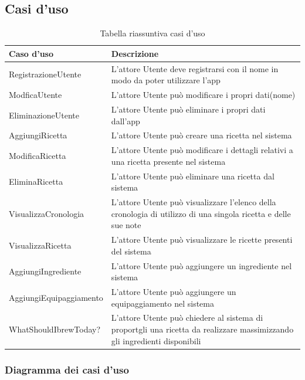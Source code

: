 \documentclass[12pt]{article}
\begin{document}
\subsection{Casi d'uso}

\begin{table}[H] %

\centering
\begin{tabular}{l|p{10cm}}%
Caso d'uso & Descrizione \\
\hline\hline
RegistrazioneUtente & L'attore Utente deve registrarsi con il nome in modo da poter utilizzare l'app \\
\hline
ModficaUtente & L'attore Utente può modificare i propri dati(nome) \\
\hline
EliminazioneUtente & L'attore Utente può eliminare i propri dati dall'app \\
\hline
AggiungiRicetta & L'attore Utente può creare una ricetta nel sistema \\
\hline
ModificaRicetta & L'attore Utente può modificare i dettagli relativi a una ricetta presente nel sistema \\
\hline
EliminaRicetta & L'attore Utente può eliminare una ricetta dal sistema \\
\hline
VisualizzaCronologia & L'attore Utente può visualizzare l'elenco della cronologia di utilizzo di una singola ricetta e delle sue note \\
\hline
VisualizzaRicetta & L'attore Utente può visualizzare le ricette presenti del sistema \\
\hline
AggiungiIngrediente & L'attore Utente può aggiungere un ingrediente nel sistema \\
\hline
AggiungiEquipaggiamento & L'attore Utente può aggiungere un equipaggiamento nel sistema \\
\hline
WhatShouldIbrewToday? & L'attore Utente può chiedere al sistema di proportgli una ricetta da realizzare massimizzando gli ingredienti disponibili \\
\end{tabular}
\caption{\label{tab:tabella_casi_d_uso}Tabella riassuntiva casi d'uso}
\end{table}


\subsubsection{Diagramma dei casi d'uso}
\end{document}
